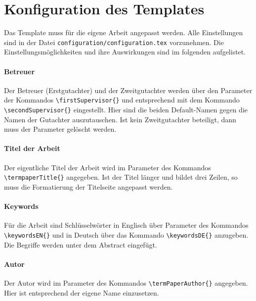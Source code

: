 %
\section{Konfiguration des Templates}\label{sec:configuraitons}
Das Template muss für die eigene Arbeit angepasst werden. Alle Einstellungen sind in der Datei \texttt{configuration/configuration.tex} vorzunehmen. Die Einstellungsmöglichkeiten und ihre Auswirkungen sind im folgenden aufgelistet.

\paragraph{Betreuer} Der Betreuer (Erstgutachter) und der Zweitgutachter werden über den Parameter der Kommandos \texttt{\textbackslash firstSupervisor\{\}} und entsprechend mit dem Kommando \texttt{\textbackslash secondSupervisor\{\}} eingestellt. Hier sind die beiden Default-Namen gegen die Namen der Gutachter auszutauschen. Ist kein Zweitgutachter beteiligt, dann muss der Parameter gelöscht werden.

\paragraph{Titel der Arbeit} Der eigentliche Titel der Arbeit wird im Parameter des Kommandos \texttt{\textbackslash termpaperTitle\{\}} angegeben. Ist der Titel länger und bildet drei Zeilen, so muss die Formatierung der Titelseite angepasst werden.

\paragraph{Keywords} Für die Arbeit sind Schlüsselwörter in Englisch über Parameter des Kommandos \texttt{\textbackslash keywordsEN\{\}} und in Deutsch über das Kommando \texttt{\textbackslash keywordsDE\{\}} anzugeben. Die Begriffe werden unter dem Abstract eingefügt.

\paragraph{Autor} Der Autor wird im Parameter des Kommandos \texttt{\textbackslash termPaperAuthor\{\}} angegeben. Hier ist entsprechend der eigene Name einzusetzen.

